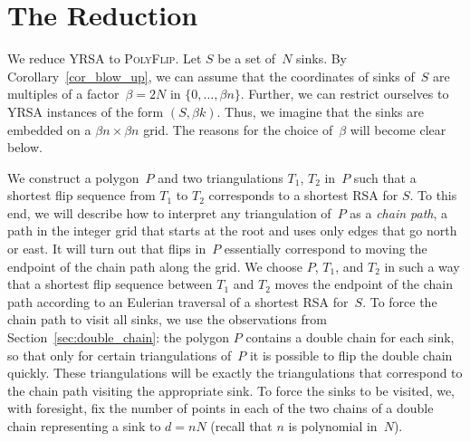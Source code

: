 \documentclass[a4paper,11pt]{article}
\begin{document}
\section{The Reduction}\label{sec_reduction}
We reduce YRSA to \textsc{PolyFlip}.
Let $S$ be a set of~$N$ sinks.
By Corollary~\ref{cor_blow_up}, we can assume that the coordinates of sinks of~$S$ are multiples of a factor~$\beta = 2N$ in $\{0, \dots , \beta n \}$.
Further, we can restrict ourselves to YRSA instances of the form $(S, \beta k)$.
Thus, we imagine that the sinks are embedded on a $\beta n \times \beta n$ grid.
The reasons for the choice of~$\beta$ will become clear below.

We construct a polygon~$P$ and two triangulations $T_1$, $T_2$ in~$P$ such that a shortest flip sequence from $T_1$ to $T_2$ corresponds to a shortest RSA for $S$.
To this end, we will describe how to interpret any triangulation of~$P$ as a \emph{chain path}, a path in the integer grid that starts at the root and uses only edges that go north or east.
It will turn out that flips in~$P$ essentially correspond to moving the endpoint of the chain path along the grid.
We choose $P$, $T_1$, and $T_2$ in such a way that a shortest flip sequence between $T_1$ and $T_2$ moves the endpoint of the chain path according to an Eulerian traversal of a shortest RSA for~$S$.
To force the chain path to visit all sinks, we use the observations from Section~\ref{sec:double_chain}: the polygon $P$ contains a double chain for each sink, so that only for certain triangulations of~$P$ it is possible to flip the double chain quickly.
These triangulations will be exactly the triangulations that correspond to the chain path visiting
the appropriate sink.
To force the sinks to be visited, we, with foresight, fix the number of points in each of the two chains of a double chain representing a sink to $d = nN$ (recall that $n$ is polynomial in~$N$).
\end{document}
